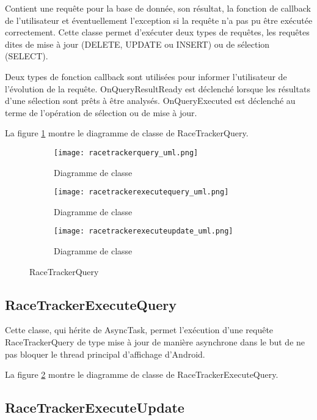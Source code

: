 Contient une requête pour la base de donnée, son résultat, la fonction de callback de l'utilisateur et éventuellement l'exception si la requête n'a pas pu être exécutée correctement. Cette classe permet d'exécuter deux types de requêtes, les requêtes dites de mise à jour (DELETE, UPDATE ou INSERT) ou de sélection (SELECT).

Deux types de fonction callback sont utilisées pour informer l'utilisateur de l'évolution de la requête. OnQueryResultReady est déclenché lorsque les résultats d'une sélection sont prêts à être analysés. OnQueryExecuted est déclenché au terme de l'opération de sélection ou de mise à jour.

La figure \ref{fig:racetrackerquery_uml} montre le diagramme de classe de RaceTrackerQuery.

 \begin{figure}[htb]
    \centering
    \begin{subfigure}[htb]{1\textwidth}
		\texttt{[image: racetrackerquery\_uml.png]} 
		\caption{Diagramme de classe}
		\label{fig:racetrackerquery_uml}
    \end{subfigure}
    \begin{subfigure}[htb]{1\textwidth}
		\texttt{[image: racetrackerexecutequery\_uml.png]} 
		\caption{Diagramme de classe}
		\label{fig:racetrackerexecutequery_uml}
    \end{subfigure}
        \begin{subfigure}[htb]{1\textwidth}
		\texttt{[image: racetrackerexecuteupdate\_uml.png]} 
		\caption{Diagramme de classe}
		\label{fig:racetrackerexecuteupdate_uml}
    \end{subfigure}
    \caption{RaceTrackerQuery}\label{fig:racetrackerquery_fig}
\end{figure}

\subsection{RaceTrackerExecuteQuery}

Cette classe, qui hérite de AsyncTask, permet l'exécution d'une requête RaceTrackerQuery de type mise à jour de manière asynchrone dans le but de ne pas bloquer le thread principal d'affichage d'Android.

La figure \ref{fig:racetrackerexecutequery_uml} montre le diagramme de classe de RaceTrackerExecuteQuery.

\subsection{RaceTrackerExecuteUpdate}

